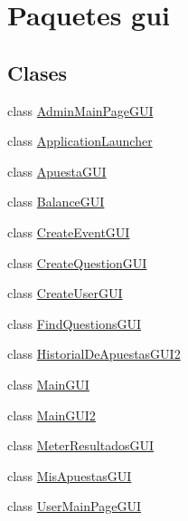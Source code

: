 \hypertarget{namespacegui}{}\section{Paquetes gui}
\label{namespacegui}
\subsection*{Clases}
\begin{DoxyCompactItemize}
\item 
class \mbox{\hyperlink{classgui_1_1AdminMainPageGUI}{Admin\+Main\+Page\+G\+UI}}
\item 
class \mbox{\hyperlink{classgui_1_1ApplicationLauncher}{Application\+Launcher}}
\item 
class \mbox{\hyperlink{classgui_1_1ApuestaGUI}{Apuesta\+G\+UI}}
\item 
class \mbox{\hyperlink{classgui_1_1BalanceGUI}{Balance\+G\+UI}}
\item 
class \mbox{\hyperlink{classgui_1_1CreateEventGUI}{Create\+Event\+G\+UI}}
\item 
class \mbox{\hyperlink{classgui_1_1CreateQuestionGUI}{Create\+Question\+G\+UI}}
\item 
class \mbox{\hyperlink{classgui_1_1CreateUserGUI}{Create\+User\+G\+UI}}
\item 
class \mbox{\hyperlink{classgui_1_1FindQuestionsGUI}{Find\+Questions\+G\+UI}}
\item 
class \mbox{\hyperlink{classgui_1_1HistorialDeApuestasGUI2}{Historial\+De\+Apuestas\+G\+U\+I2}}
\item 
class \mbox{\hyperlink{classgui_1_1MainGUI}{Main\+G\+UI}}
\item 
class \mbox{\hyperlink{classgui_1_1MainGUI2}{Main\+G\+U\+I2}}
\item 
class \mbox{\hyperlink{classgui_1_1MeterResultadosGUI}{Meter\+Resultados\+G\+UI}}
\item 
class \mbox{\hyperlink{classgui_1_1MisApuestasGUI}{Mis\+Apuestas\+G\+UI}}
\item 
class \mbox{\hyperlink{classgui_1_1UserMainPageGUI}{User\+Main\+Page\+G\+UI}}
\end{DoxyCompactItemize}
